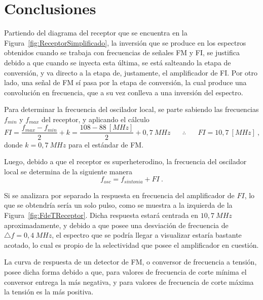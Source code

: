   \section{Conclusiones}
    Partiendo del diagrama del receptor que se encuentra en la Figura~\ref{fig:ReceptorSimplificado},
    la inversión que se produce en los espectros obtenidos cuando se trabaja con frecuencias de
    señales FM y  FI, se justifica debido a que cuando se inyecta esta última, se está
    salteando la etapa de conversión, y va directo a la etapa de, justamente, el amplificador de FI.
    Por otro lado, una señal de FM sí pasa por la etapa de conversión, la cual produce una convolución 
    en frecuencia, que a su vez conlleva a una inversión del espectro.

    Para determinar la frecuencia del oscilador local, se parte sabiendo las frecuencias 
    \(f_{min}\) y \(f_{max}\) del receptor, y
    aplicando el cálculo 
      \begin{equation*}
        FI = \dfrac{f_{max} - f_{min}}{2} + k = 
        \dfrac{108 - 88~[MHz]}{2} + 0,7~MHz \hspace{20pt} \therefore \hspace{20pt} FI = 10,7~[MHz]~,
      \end{equation*}
    donde \(k = 0,7~MHz\) para el estándar de FM.
    
    Luego, debido a que el receptor es superheterodino, la frecuencia del oscilador local 
    se determina de la siguiente manera
      \begin{equation*}
        f_{osc} = f_{sintonia} +FI~.
      \end{equation*}

    Si se analizara por separado la respuesta en frecuencia del amplificador de \(FI\), lo que
    se obtendría sería un solo pulso, como se muestra a la izquierda de la Figura~\ref{fig:FdeTReceptor}.
    Dicha respuesta estará centrada en \(10,7~MHz\) aproximadamente, y debido a que 
    posee una desviación de frecuencia de \(\triangle f = 0,4~MHz\), el espectro que
    se podría llegar a visualizar estaría bastante acotado, lo cual es propio de la 
    selectividad que posee el amplificador en cuestión.   
    
    La curva de respuesta de un detector de FM, o conversor de frecuencia a tensión, 
    posee dicha forma debido a que, para valores de frecuencia de corte mínima el 
    conversor entrega la más negativa, y para valores  de frecuencia de 
    corte máxima la tensión es la más positiva.   
    
